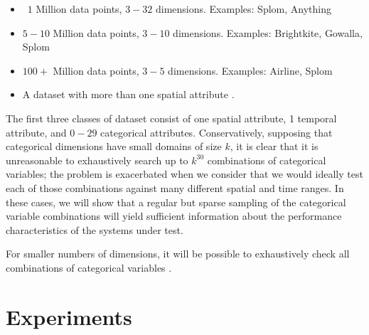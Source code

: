 \documentclass[journal]{vgtc}                %
\begin{document}
\begin{itemize}

	\item ~$1$ Million data points, $3-32$ dimensions. Examples: Splom, Anything

	\item $5-10$ Million data points, $3-10$ dimensions. Examples: Brightkite,
		Gowalla, Splom

	\item $100+$ Million data points, $3-5$ dimensions. Examples: Airline,
		Splom

	\item A dataset with more than one spatial attribute .

\end{itemize}

The first three classes of dataset consist of one spatial attribute, 1 temporal
attribute, and $0-29$ categorical attributes. Conservatively, supposing that
categorical dimensions have small domains of size $k$, it is clear that it is
unreasonable to exhaustively search up to $k^{30}$ combinations of categorical
variables; the problem is exacerbated when we consider that we would ideally
test each of those combinations against many different spatial and time ranges.
In these cases, we will show that a regular but sparse sampling of the
categorical variable combinations will yield sufficient information about the
performance characteristics of the systems under test. 

For smaller numbers of dimensions, it will be possible to exhaustively check all combinations of categorical variables .






\section{Experiments}

\end{document}
